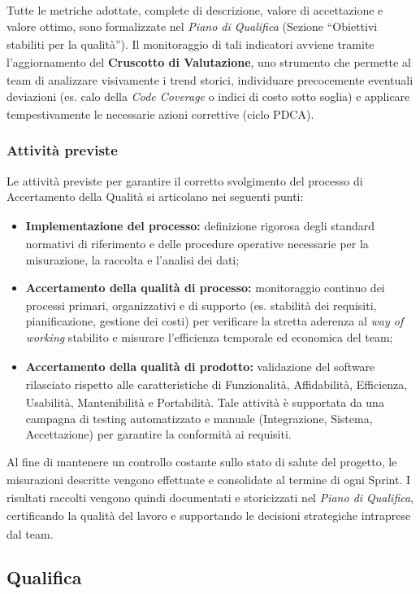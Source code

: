 \documentclass[a4paper,11pt]{article}
\newcommand{\G}{\textsubscript{\scalebox{0.6}{\textbf{G}}}}
\begin{document}
Tutte le metriche adottate, complete di descrizione, valore di accettazione e valore ottimo, sono formalizzate nel \textit{Piano di Qualifica\G{}} (Sezione ``Obiettivi stabiliti per la qualità\G{}''). Il monitoraggio di tali indicatori avviene tramite l'aggiornamento del \textbf{Cruscotto\G{} di Valutazione}, uno strumento che permette al team di analizzare visivamente i trend storici, individuare precocemente eventuali deviazioni (es. calo della \textit{Code Coverage\G{}} o indici di costo sotto soglia) e applicare tempestivamente le necessarie azioni correttive (ciclo PDCA).

\subsubsection{Attività previste}
Le attività previste per garantire il corretto svolgimento del processo di Accertamento della Qualità\G{} si articolano nei seguenti punti:
\begin{itemize}
    \item \textbf{Implementazione\G{} del processo:} definizione rigorosa degli standard normativi di riferimento e delle procedure operative necessarie per la misurazione, la raccolta e l'analisi dei dati;
    \item \textbf{Accertamento della qualità\G{} di processo:} monitoraggio continuo dei processi primari, organizzativi e di supporto (es. stabilità dei requisiti, pianificazione, gestione dei costi) per verificare la stretta aderenza al \textit{way of working\G{}} stabilito e misurare l'efficienza\G{} temporale ed economica del team;
    \item \textbf{Accertamento della qualità\G{} di prodotto\G{}:} validazione\G{} del software rilasciato rispetto alle caratteristiche di Funzionalità\G{}, Affidabilità\G{}, Efficienza\G{}, Usabilità, Mantenibilità e Portabilità. Tale attività è supportata da una campagna di testing automatizzato e manuale (Integrazione, Sistema, Accettazione) per garantire la conformità ai requisiti.
\end{itemize}

Al fine di mantenere un controllo costante sullo stato di salute del progetto\G{}, le misurazioni descritte vengono effettuate e consolidate al termine di ogni Sprint\G{}. I risultati raccolti vengono quindi documentati e storicizzati nel \textit{Piano di Qualifica\G{}}, certificando la qualità\G{} del lavoro e supportando le decisioni strategiche intraprese dal team.


\subsection{Qualifica}
\end{document}
